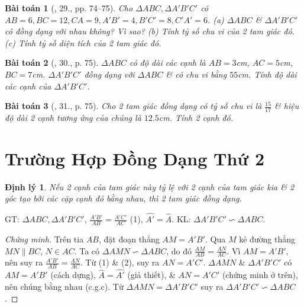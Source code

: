 \documentclass{article}
\newtheorem{baitoan}{Bài toán}
\newtheorem{dinhly}{Định lý}
\begin{document}
\begin{baitoan}[\cite{SGK_Toan_8_tap_2}, 29., pp. 74--75]
	Cho $\Delta ABC,\Delta A'B'C'$ có $AB = 6, BC = 12, CA = 9, A'B' = 4, B'C' = 8, C'A' = 6$. (a) $\Delta ABC$ \& $\Delta A'B'C'$ có đồng dạng với nhau không? Vì sao? (b) Tính tỷ số chu vi của 2 tam giác đó. (c) Tính tỷ số diện tích của 2 tam giác đó.
\end{baitoan}

\begin{baitoan}[\cite{SGK_Toan_8_tap_2}, 30., p. 75]
	$\Delta ABC$ có độ dài các cạnh là $AB = 3$\emph{cm}, $AC = 5$\emph{cm}, $BC = 7$\emph{cm}. $\Delta A'B'C'$ đồng dạng với $\Delta ABC$ \& có chu vi bằng $55$\emph{cm}. Tính độ dài các cạnh của $\Delta A'B'C'$.
\end{baitoan}

\begin{baitoan}[\cite{SGK_Toan_8_tap_2}, 31., p. 75]
	Cho 2 tam giác đồng dạng có tỷ số chu vi là $\frac{15}{17}$ \& hiệu độ dài 2 cạnh tương ứng của chúng là $12.5$\emph{cm}. Tính 2 cạnh đó.
\end{baitoan}


\section{Trường Hợp Đồng Dạng Thứ 2}

\begin{dinhly}
	Nếu 2 cạnh của tam giác này tỷ lệ với 2 cạnh của tam giác kia \& 2 góc tạo bởi các cặp cạnh đó bằng nhau, thì 2 tam giác đồng dạng.
\end{dinhly}
GT: $\Delta ABC,\Delta A'B'C'$, $\frac{A'B'}{AB} = \frac{A'C'}{AC}$ (1), $\widehat{A'} = \widehat{A}$. KL: $\Delta A'B'C'\backsim\Delta ABC$.

\begin{proof}[Chứng minh]
	Trên tia $AB$, đặt đoạn thẳng $AM = A'B'$. Qua $M$ kẻ đường thẳng $MN\parallel BC$, $N\in AC$. Ta có $\Delta AMN\backsim\Delta ABC$, do đó $\frac{AM}{AB} = \frac{AN}{AC}$. Vì $AM = A'B'$, nên suy ra $\frac{A'B'}{AB} = \frac{AN}{AC}$. Từ (1) \& (2), suy ra $AN = A'C'$. $\Delta AMN$ \& $\Delta A'B'C'$ có $AM = A'B'$ (cách dựng), $\widehat{A} = \widehat{A'}$ (giả thiết), \& $AN = A'C'$ (chứng minh ở trên), nên chúng bằng nhau (c.g.c). Từ $\Delta AMN = \Delta A'B'C'$ suy ra $\Delta A'B'C'\backsim\Delta ABC$.
\end{proof}
\end{document}
